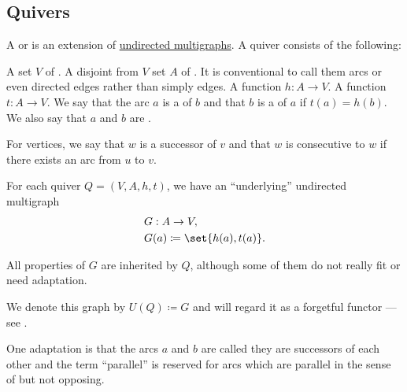 \subsection{Quivers}\label{subsec:quivers}

\begin{definition}\label{def:quiver}
  A  or  is an extension of \hyperref[def:undirected_multigraph]{undirected multigraphs}. A quiver consists of the following:
  \begin{thmenum}
     A set \( V \) of .
     A disjoint from \( V \) set \( A \) of . It is conventional to call them arcs or even directed edges rather than simply edges.
     A  function \( h: A \to V \).
     A  function \( t: A \to V \).
     We say that the arc \( a \) is a  of \( b \) and that \( b \) is a  of \( a \) if \( t(a) = h(b) \). We also say that \( a \) and \( b \) are .

    For vertices, we say that \( w \) is a successor of \( v \) and that \( w \) is consecutive to \( w \) if there exists an arc from \( u \) to \( v \).

     For each quiver \( Q = (V, A, h, t) \), we have an \enquote{underlying} undirected multigraph
    \begin{equation}\label{eq:def:quiver/forgetful}
      \begin{aligned}
        &G: A \to V, \\
        &G(a) \coloneqq \set{ h(a), t(a) }.
      \end{aligned}
    \end{equation}

    All properties of \( G \) are inherited by \( Q \), although some of them do not really fit or need adaptation.

    We denote this graph by \( U(Q) \coloneqq G \) and will regard it as a forgetful functor --- see .

     One adaptation is that the arcs \( a \) and \( b \) are called  they are successors of each other and the term \enquote{parallel} is reserved for arcs which are parallel in the sense of  but not opposing.


\end{thmenum}
\end{definition}

